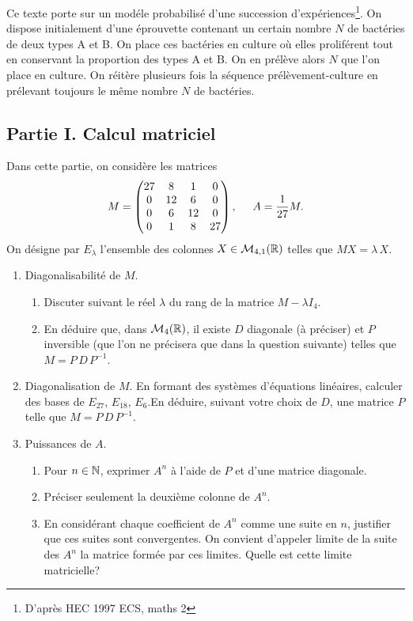Ce texte porte sur un modéle probabilisé d'une succession d'expériences\footnote{D'après HEC 1997 ECS, maths 2}.\newline
On dispose initialement d'une éprouvette contenant un certain nombre $N$ de bactéries de deux types A et B. On place ces bactéries en culture où elles proliférent tout en conservant la proportion des types A et B. On en prélève alors $N$ que l'on place en culture.  On réitère plusieurs fois la séquence prélèvement-culture en prélevant toujours le même nombre $N$ de bactéries.

\subsection*{Partie I. Calcul matriciel}
Dans cette partie, on considère les matrices
\begin{displaymath}
  M = 
\begin{pmatrix}
  27 & 8 & 1 & 0 \\ 0 & 12 & 6 & 0 \\ 0 & 6 & 12 & 0 \\ 0 & 1 & 8 & 27
\end{pmatrix}
, \hspace{0.5cm} A=\frac{1}{27}M.
\end{displaymath}
On désigne par $E_\lambda$ l'ensemble des colonnes $X\in \mathcal{M}_{4,1}(\mathbb{R})$ telles que $MX = \lambda\,X$.
\begin{enumerate}
  \item Diagonalisabilité de $M$.
\begin{enumerate}
  \item Discuter suivant le réel $\lambda$ du rang de la matrice $M-\lambda I_4$.
  \item En déduire que, dans $\mathcal{M}_4(\mathbb{R})$, il existe $D$ diagonale (à préciser) et $P$ inversible (que l'on ne précisera que dans la question suivante) telles que $M = P\, D\, P^{-1}$. 
\end{enumerate}

\item Diagonalisation de $M$.\newline
 En formant des systèmes d'équations linéaires, calculer des bases de $E_{27}$, $E_{18}$, $E_6$.\newline En déduire, suivant votre choix de $D$, une matrice $P$ telle que $M = P\, D\, P^{-1}$. 
 
\item Puissances de $A$.
\begin{enumerate}
  \item Pour $n\in \mathbb{N}$, exprimer $A^n$ à l'aide de $P$ et d'une matrice diagonale.
  \item Préciser seulement la deuxième colonne de $A^n$.
  \item En considérant chaque coefficient de $A^n$ comme une suite en $n$, justifier que ces suites sont convergentes. On convient d'appeler limite de la suite des $A^n$ la matrice formée par ces limites. Quelle est cette limite matricielle? 
\end{enumerate}

\end{enumerate}

